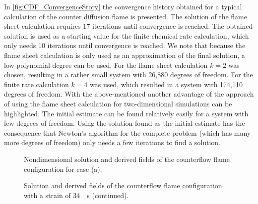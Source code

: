 In \cref{fig:CDF_ConvergenceStory} the convergence history obtained for a typical calculation of the counter diffusion flame is presented. The solution of the flame sheet calculation requires 17 iterations until convergence is reached. The obtained solution is used as a starting value for the finite chemical rate calculation, which only needs 10 iterations until convergence is reached. We note that because the flame sheet calculation is only used as an approximation of the final solution, a low polynomial degree can be used. For the flame sheet calculation $k = 2$ was chosen, resulting in a rather small system with 26,880 degrees of freedom. For the finite rate calculation $k = 4$ was used, which resulted in a system with 174,110 degrees of freedom.  With the above-mentioned another advantage of the approach of using the flame sheet calculation for two-dimensional simulations can be highlighted. The initial estimate can be found relatively easily for a system with few degrees of freedom. Using the solution found as the initial estimate has the consequence that Newton's algorithm for the complete problem (which has many more degrees of freedom) only needs a few iterations to find a solution.
\begin{figure}[h]
	\centering
	\pgfplotsset{width=0.73\textwidth, compat=1.3}
	\caption{Nondimensional solution and derived fields of the counterflow flame configuration for case (a).} \label{fig:CoFlowFlameFig1}
\end{figure}
\begin{figure}[h]
	\ContinuedFloat
	\centering
	\pgfplotsset{width=0.73\textwidth, compat=1.3}	
	\caption{Solution and derived fields of the counterflow flame configuration with a strain of \SI{34}{\per \second} (continued).}%
\end{figure}
